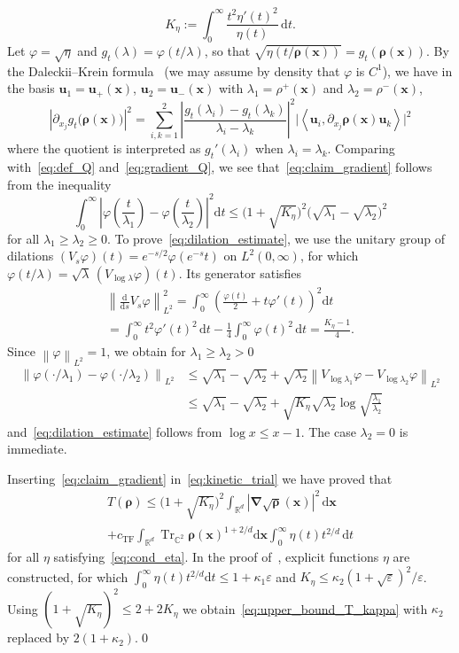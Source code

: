 \documentclass[final,reqno]{amsart}
\theoremstyle{remark}
\renewcommand{\le}{\leqslant}
\renewcommand{\ge}{\geqslant}
\let\phi=\varphi
\renewcommand{\epsilon}{\varepsilon}
\DeclareMathOperator{\Tr}{Tr}
\newcommand{\Trs}{\Tr_{\CC^2}}
\newcommand{\RR}{\mathbb{R}}
\newcommand{\CC}{\mathbb{C}}
\newcommand{\TF}{\mathrm{TF}}
\newcommand{\pscal}[1]{\left\langle #1 \right\rangle}
\newcommand{\norm}[1]{\left\| #1 \right\|}
\newcommand{\grad}{\bm{\nabla}}
\newcommand{\dd}{\mathrm{d}}
\begin{document}
$$
K_\eta:=\int_0^\infty \frac{t^2\eta'(t)^2}{\eta(t)}\,\dd t.
$$
Let $\phi=\sqrt\eta$ and $g_t(\lambda)=\phi(t/\lambda)$, so that $\sqrt{\eta(t/\bm{\rho}(\mathbf{x}))}=g_t(\bm{\rho}(\mathbf{x}))$. By the Daleckii--Krein formula~\cite[Chapter V]{bhatia1997matrix} (we may assume by density that $\phi$ is $C^1$), we have in the basis $\mathbf{u}_1=\mathbf{u}_+(\mathbf{x})$, $\mathbf{u}_2=\mathbf{u}_-(\mathbf{x})$ with $\lambda_1=\rho^+(\mathbf{x})$ and $\lambda_2=\rho^-(\mathbf{x})$,
$$
\left|\partial_{x_j}g_t\big(\bm{\rho}(\mathbf{x})\big)\right|^2=\sum_{i,k=1}^2\left|\frac{g_t(\lambda_i)-g_t(\lambda_k)}{\lambda_i-\lambda_k}\right|^2\big|\pscal{\mathbf{u}_i,\partial_{x_j}\bm{\rho}(\mathbf{x})\mathbf{u}_k}\big|^2
$$
where the quotient is interpreted as $g_t'(\lambda_i)$ when $\lambda_i=\lambda_k$. Comparing with~\cref{eq:def_Q} and~\cref{eq:gradient_Q}, we see that~\cref{eq:claim_gradient} follows from the inequality
\begin{equation}\label{eq:dilation_estimate}
\int_0^\infty\left|\phi\left(\frac{t}{\lambda_1}\right)-\phi\left(\frac{t}{\lambda_2}\right)\right|^2\dd t\le \big(1+\sqrt{K_\eta}\big)^2\big(\sqrt{\lambda_1}-\sqrt{\lambda_2}\big)^2
\end{equation}
for all $\lambda_1\ge\lambda_2\ge0$. To prove~\cref{eq:dilation_estimate}, we use the unitary group of dilations $(V_s\phi)(t)=e^{-s/2}\phi(e^{-s}t)$ on $L^2(0,\infty)$, for which $\phi(t/\lambda)=\sqrt\lambda\,(V_{\log\lambda}\phi)(t)$. Its generator satisfies
\begin{multline*}
\norm{\frac{\dd}{\dd s}V_s\phi}_{L^2}^2=\int_0^\infty\left(\frac{\phi(t)}2+t\phi'(t)\right)^2\dd t\\
=\int_0^\infty t^2\phi'(t)^2\,\dd t-\frac14\int_0^\infty\phi(t)^2\,\dd t=\frac{K_\eta-1}{4}.
\end{multline*}
Since $\norm{\phi}_{L^2}=1$, we obtain for $\lambda_1\ge\lambda_2>0$
\begin{align*}
\norm{\phi(\cdot/\lambda_1)-\phi(\cdot/\lambda_2)}_{L^2}&\le \sqrt{\lambda_1}-\sqrt{\lambda_2}+\sqrt{\lambda_2}\norm{V_{\log\lambda_1}\phi-V_{\log\lambda_2}\phi}_{L^2}\\
&\le \sqrt{\lambda_1}-\sqrt{\lambda_2}+\sqrt{K_\eta}\sqrt{\lambda_2}\log\sqrt{\frac{\lambda_1}{\lambda_2}}
\end{align*}
and~\cref{eq:dilation_estimate} follows from $\log x\le x-1$. The case $\lambda_2=0$ is immediate.

Inserting~\cref{eq:claim_gradient} in~\cref{eq:kinetic_trial} we have proved that
\begin{multline*}
T(\bm{\rho})\le \big(1+\sqrt{K_\eta}\big)^2\int_{\RR^d}|\grad\sqrt{\bm{\rho}}(\mathbf{x})|^2\,\dd \mathbf{x}\\
+c_\TF\int_{\RR^d}\Trs \bm{\rho}(\mathbf{x})^{1+2/d}\dd \mathbf{x}\int_0^\infty \eta(t)t^{2/d}\,\dd t
\end{multline*}
for all $\eta$ satisfying~\cref{eq:cond_eta}. In the proof of~\cite[Theorem~8]{lewin2020local}, explicit functions $\eta$ are constructed, for which $\int_0^\infty\eta(t)t^{2/d}\dd t\le 1+\kappa_1\epsilon$ and $K_\eta\le\kappa_2(1+\sqrt\epsilon)^2/\epsilon$. Using $(1+\sqrt{K_\eta})^2\le 2+2K_\eta$ we obtain~\cref{eq:upper_bound_T_kappa} with $\kappa_2$ replaced by $2(1+\kappa_2)$.\qed
\end{document}
